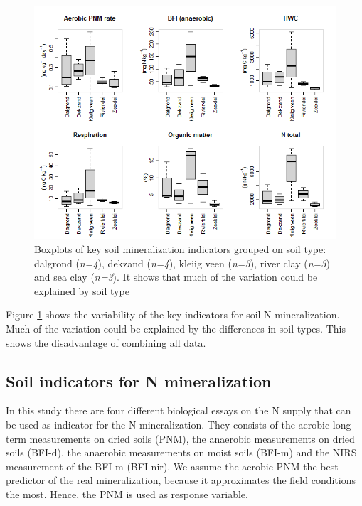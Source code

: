\documentclass[10pt,twoside,dutch,english]{report}
\begin{document}
	\begin{figure}[ht] %
		
		\centering
		\includegraphics[width=1\linewidth]{results_boxplots}
		\caption{Boxplots of key soil mineralization indicators grouped on soil type: dalgrond (\textit{n=4}), dekzand (\textit{n=4}), kleiig veen (\textit{n=3}), river clay (\textit{n=3}) and sea clay (\textit{n=3}). It shows  that much of the variation could be explained by soil type}
		\label{fig:results_boxplots}
	\end{figure}
Figure \ref{fig:results_boxplots} shows the variability of the key indicators for soil N mineralization. Much of the variation could be explained by the differences in soil types. This shows the disadvantage of combining all data. 

\subsection{Soil indicators for N mineralization} 
In this study there are four different biological essays on the N supply that can be used as indicator for the N mineralization. They consists of the aerobic long term measurements on dried soils (PNM), the anaerobic measurements on dried soils (BFI-d), the anaerobic measurements on moist soils (BFI-m) and the NIRS measurement of the BFI-m (BFI-nir). We assume the aerobic PNM the best predictor of the real mineralization, because it approximates the field conditions the most. Hence, the PNM is used as response variable. 
\end{document}
